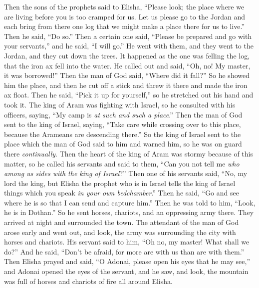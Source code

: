 \begin{biblechapter} %
 Then the sons of the prophets said to Elisha, “Please look; the place where we are living before you is too cramped for us.
\verse Let us please go to the Jordan and each bring from there one log that we might make a place there for us to live.” Then he said, “Do so.”
\verse Then a certain one said, “Please be prepared and go with your servants,” and he said, “I will go.”
\verse He went with them, and they went to the Jordan, and they cut down the trees.
\verse It happened as the one was felling the log, that the iron ax fell into the water. He called out and said, “Oh, no! My master, it was borrowed!”
\verse Then the man of God said, “Where did it fall?” So he showed him the place, and then he cut off a stick and threw it there and made the iron ax float.
\verse Then he said, “Pick it up for yourself,” so he stretched out his hand and took it.
 The king of Aram was fighting with Israel, so he consulted with his officers, saying, “My camp is \textit{at such and such a place}.”
\verse Then the man of God sent to the king of Israel, saying, “Take care while crossing over to this place, because the Arameans are descending there.”
\verse So the king of Israel sent to the place which the man of God said to him and warned him, so he was on guard there \textit{continually}.
\verse Then the heart of the king of Aram was stormy because of this matter, so he called his servants and said to them, “Can you not tell me \textit{who among us sides with the king of Israel}?”
\verse Then one of his servants said, “No, my lord the king, but Elisha the prophet who is in Israel tells the king of Israel things which you speak \textit{in your own bedchamber}.”
\verse Then he said, “Go and see where he is so that I can send and capture him.” Then he was told to him, “Look, he is in Dothan.”
\verse So he sent horses, chariots, and an oppressing army there. They arrived at night and surrounded the town.
\verse The attendant of the man of God arose early and went out, and look, the army was surrounding the city with horses and chariots. His servant said to him, “Oh no, my master! What shall we do?”
\verse And he said, “Don’t be afraid, for more are with us than are with them.”
\verse Then Elisha prayed and said, “O Adonai, please open his eyes that he may see,” and Adonai opened the eyes of the servant, and he saw, and look, the mountain was full of horses and chariots of fire all around Elisha.

\end{biblechapter}
